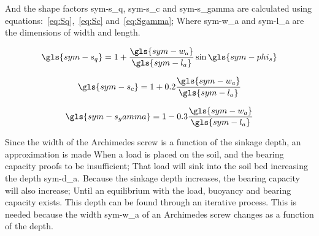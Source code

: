 \noindent And the shape factors \gls{sym-s_q}, \gls{sym-s_c} and \gls{sym-s_gamma} are calculated using
equations:~\ref{eq:Sq},~\ref{eq:Sc} and~\ref{eq:Sgamma}; Where \gls{sym-w_a} and \gls{sym-l_a} are the dimensions of
width and length.

\begin{equation}
    \label{eq:Sq}
    \gls{sym-s_q} = 1 + \frac{\gls{sym-w_a}}{\gls{sym-l_a}} \sin \gls{sym-phi_s}
\end{equation}

\begin{equation}
    \label{eq:Sc}
    \gls{sym-s_c} = 1 + 0.2 \frac{\gls{sym-w_a}}{\gls{sym-l_a}}
\end{equation}

\begin{equation}
    \label{eq:Sgamma}
    \gls{sym-s_gamma} = 1 - 0.3 \frac{\gls{sym-w_a}}{\gls{sym-l_a}}
\end{equation}

\noindent Since the width of the Archimedes screw is a function of the sinkage depth, an approximation is made When a
load is placed on the soil, and the bearing capacity proofs to be insufficient; That load will sink into the soil bed
increasing the depth \gls{sym-d_a}. Because the sinkage depth increases, the bearing capacity will also increase; Until
an equilibrium with the load, buoyancy and bearing capacity exists. This depth can be found through an iterative
process. This is needed because the width \gls{sym-w_a} of an Archimedes screw changes as a function of the depth.

